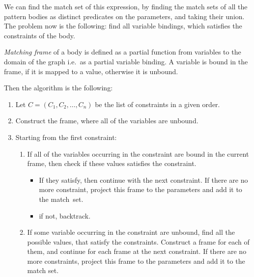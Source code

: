 We can find the match set of this expression, by finding the match sets of all the pattern bodies as distinct predicates on the parameters, and taking their union.
The problem now is the following: find all variable bindings, which satisfies the constraints of the body.

\emph{Matching frame} of a body is defined as a partial function from variables to the domain of the graph i.e.\ as a partial variable binding.
A variable is bound in the frame, if it is mapped to a value, otherwise it is unbound.

Then the algorithm is the following:
\begin{enumerate}
	
\item
Let $C = (C_1, C_2, \dots{}, C_n )$ be the list of constraints in a given order.

\item 
Construct the frame, where all of the variables are unbound.

\item 
Starting from the first constraint:
	\begin{enumerate}
		\item 
		If all of the variables occurring in the constraint are bound in the current frame, then check if these values satisfies the constraint. 
		\begin{itemize}
			\item If they satisfy, then continue with the next constraint. If there are no more constraint, project this frame to the parameters and add it to the \mbox{match set}.
			\item if not, backtrack.
		\end{itemize}
		
		\item 
		If some variable occurring in the constraint are unbound, find all the possible values, that satisfy the constraints.
		Construct a frame for each of them, and continue for each frame at the next constraint. If there are no more constraints, project this frame to the parameters and add it to the match set.	
	\end{enumerate}	
\end{enumerate}
	
